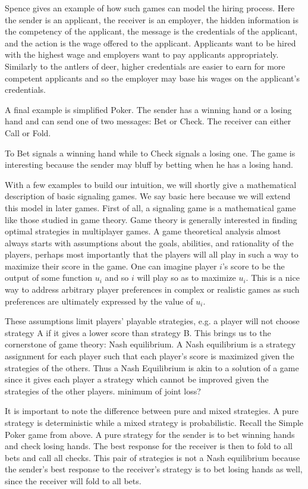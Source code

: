 \documentclass{article}
\begin{document}
Spence \cite{spence1} gives an example of how such games can model the hiring process. Here the sender is an applicant, the receiver is an employer, the hidden information is the competency of the applicant, the message is the credentials of the applicant, and the action is the wage offered to the applicant. Applicants want to be hired with the highest wage and employers want to pay applicants appropriately. Similarly to the antlers of deer, higher credentials are easier to earn for more competent applicants and so the employer may base his wages on the applicant's credentials.

A final example is simplified Poker. The sender has a winning hand or a losing hand and can send one of two messages: Bet or Check. The receiver can either Call or Fold.

To Bet signals a winning hand while to Check signals a losing one. The game is interesting because the sender may bluff by betting when he has a losing hand. 

With a few examples to build our intuition, we will shortly give a mathematical description of basic signaling games. We say basic here because we will extend this model in later games. First of all, a signaling game is a mathematical game like those studied in game theory. Game theory is generally interested in finding optimal strategies in multiplayer games. A game theoretical analysis almost always starts with assumptions about the goals, abilities, and rationality of the players, perhaps most importantly that the players will all play in such a way to maximize their score in the game. One can imagine player $i$'s score to be the output of some function $u_i$ and so $i$ will play so as to maximize $u_i$. This is a nice way to address arbitrary player preferences in complex or realistic games as such preferences are ultimately expressed by the value of $u_i$. 

These assumptions limit players' playable strategies, e.g. a player will not choose strategy A if it gives a lower score than strategy B. This brings us to the cornerstone of game theory: Nash equilibrium. A Nash equilibrium is a strategy assignment for each player such that each player's score is maximized given the strategies of the others. Thus a Nash Equilibrium is akin to a solution of a game since it gives each player a strategy which cannot be improved given the strategies of the other players. minimum of joint loss?

It is important to note the difference between pure and mixed strategies. A pure strategy is deterministic while a mixed strategy is probabilistic. Recall the Simple Poker game from above. A pure strategy for the sender is to bet winning hands and check losing hands. The best response for the receiver is then to fold to all bets and call all checks. This pair of strategies is not a Nash equilibrium because the sender's best response to the receiver's strategy is to bet losing hands as well, since the receiver will fold to all bets. 
\end{document}
